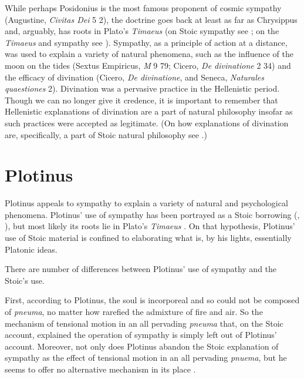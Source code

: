 While perhaps Posidonius is the most famous proponent of cosmic sympathy (Augustine, \emph{Civitas Dei} 5 2), the doctrine goes back at least as far as Chrysippus and, arguably, has roots in Plato's \emph{Timaeus} (on Stoic sympathy see \citealt{Sambursky:1959ms,Meyer:2009xp,Brouwer:2015ee}; on the \emph{Timaeus} and sympathy see \citealt{Emilsson:2015wf}). Sympathy, as a principle of action at a distance, was used to explain a variety of natural phenomena, such as the influence of the moon on the tides (Sextus Empiricus, \emph{M} 9 79; Cicero, \emph{De divinatione} 2 34) and the efficacy of divination (Cicero, \emph{De divinatione}, and Seneca, \emph{Naturales quaestiones} 2). Divination was a pervasive practice in the Hellenistic period. Though we can no longer give it credence, it is important to remember that Hellenistic explanations of divination are a part of natural philosophy insofar as such practices were accepted as legitimate. (On how explanations of divination are, specifically, a part of Stoic natural philosophy see \citealt{Struck:2007aa}.)


\section{Plotinus} %
\label{sec:plotinus}

Plotinus appeals to sympathy to explain a variety of natural and psychological phenomena. Plotinus' use of sympathy has been portrayed as a Stoic borrowing (\citealt[chapter 3]{Emilsson:1988uq}, \citealt{Ierodiakonou:2006gf}), but most likely its roots lie in Plato's \emph{Timaeus} \citep{Emilsson:2015wf}. On that hypothesis, Plotinus' use of Stoic material is confined to elaborating what is, by his lights, essentially Platonic ideas.

There are number of differences between Plotinus' use of sympathy and the Stoic's use.

First, according to Plotinus, the soul is incorporeal and so could not be composed of \emph{pneuma}, no matter how rarefied the admixture of fire and air. So the mechanism of tensional motion in an all pervading \emph{pneuma} that, on the Stoic account, explained the operation of sympathy is simply left out of Plotinus' account. Moreover, not only does Plotinus abandon the Stoic explanation of sympathy as the effect of tensional motion in an all pervading \emph{pnuema}, but he seems to offer no alternative mechanism in its place \citep[48]{Emilsson:1988uq}.

